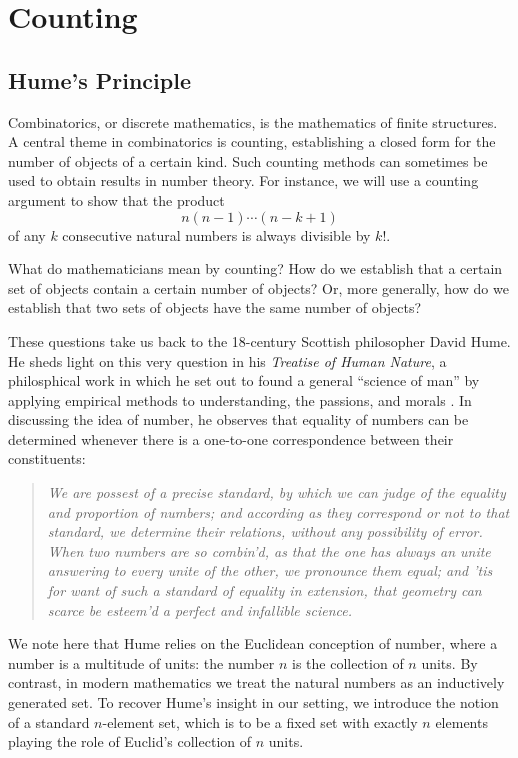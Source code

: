 \chapter{Counting}\label{chapter:combinatorial-methods}

\section{Hume's Principle}

Combinatorics, or discrete mathematics,
is the mathematics of finite structures.
A central theme in combinatorics is counting,
establishing a closed form for the number of objects of a certain kind.
Such counting methods can sometimes be used to obtain results in number theory.
For instance, we will use a counting argument to show that the product
\begin{equation*}
  n(n-1)\cdots(n-k+1)
\end{equation*}
of any $k$ consecutive natural numbers is always divisible by $k!$.

What do mathematicians mean by counting? How do we establish that a certain set of objects contain a certain number of objects? Or, more generally, how do we establish that two sets of objects have the same number of objects?

These questions take us back to the 18\supth{}-century Scottish philosopher David Hume. He sheds light on this very question in his \emph{Treatise of Human Nature},
a philosphical work in which he set out to found a general ``science of man'' by applying empirical methods to understanding, the passions, and morals \cite[Part III, Book I]{hume1978}.
In discussing the idea of number, he observes that equality of numbers can be determined whenever there is a one-to-one correspondence between their constituents:
\begin{quote}
  {\itshape We are possest of a precise standard, by which we can judge
    of the equality and proportion of numbers; and according as they correspond
    or not to that standard, we determine their relations, without any
    possibility of error. When two numbers are so combin'd, as that the one has
    always an unite answering to every unite of the other, we pronounce them
    equal; and 'tis for want of such a standard of equality in extension, that
    geometry can scarce be esteem'd a perfect and infallible science.}
\end{quote}
We note here that Hume relies on the Euclidean conception of number,
where a number is a multitude of units:
the number $n$ is the collection of $n$ units.
By contrast,
in modern mathematics we treat the natural numbers as an inductively generated set.
To recover Hume's insight in our setting,
we introduce the notion of a standard $n$-element set,
which is to be a fixed set with exactly $n$ elements playing the role of Euclid's collection of $n$ units.

